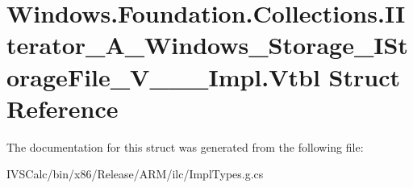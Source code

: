 \hypertarget{struct_windows_1_1_foundation_1_1_collections_1_1_i_iterator___a___windows___storage___i_storage_file___v_______impl_1_1_vtbl}{}\section{Windows.\+Foundation.\+Collections.\+I\+Iterator\+\_\+\+A\+\_\+\+Windows\+\_\+\+Storage\+\_\+\+I\+Storage\+File\+\_\+\+V\+\_\+\+\_\+\+\_\+\+Impl.\+Vtbl Struct Reference}
\label{struct_windows_1_1_foundation_1_1_collections_1_1_i_iterator___a___windows___storage___i_storage_file___v_______impl_1_1_vtbl}


The documentation for this struct was generated from the following file\+:\begin{DoxyCompactItemize}
\item 
I\+V\+S\+Calc/bin/x86/\+Release/\+A\+R\+M/ilc/Impl\+Types.\+g.\+cs\end{DoxyCompactItemize}
